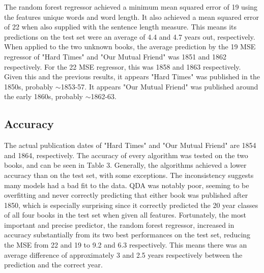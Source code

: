\documentclass[11pt,a4paper,reqno]{amsart}
\begin{document}

The random forest regressor achieved a minimum mean squared error of 19 using the features unique words and word length. It also achieved a mean squared error of 22 when also supplied with the sentence length measure. This means its predictions on the test set were an average of 4.4 and 4.7 years out, respectively. When applied to the two unknown books, the average prediction by the 19 MSE regressor of "Hard Times" and "Our Mutual Friend" was 1851 and 1862 respectively. For the 22 MSE regressor, this was 1858 and 1863 respectively. Given this and the previous results, it appears "Hard Times" was published in the 1850s, probably $\sim$1853-57. It appears "Our Mutual Friend" was published around the early 1860s, probably $\sim$1862-63.




\subsection{Accuracy}
The actual publication dates of "Hard Times" and "Our Mutual Friend" are 1854 and 1864, respectively. The accuracy of every algorithm was tested on the two books, and can be seen in Table 3. Generally, the algorithms achieved a lower accuracy than on the test set, with some exceptions. The inconsistency suggests many models had a bad fit to the data. QDA was notably poor, seeming to be overfitting and never correctly predicting that either book was published after 1850, which is especially surprising since it correctly predicted the 20 year classes of all four books in the test set when given all features. Fortunately, the most important and precise predictor, the random forest regressor, increased in accuracy substantially from its two best performances on the test set, reducing the MSE from 22 and 19 to 9.2 and 6.3 respectively. This means there was an average difference of approximately 3 and 2.5 years respectively between the prediction and the correct year.
\end{document}
